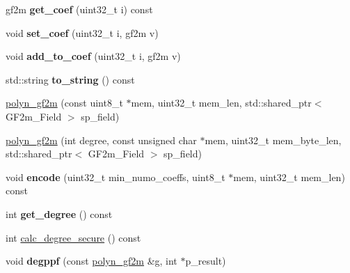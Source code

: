 \begin{DoxyCompactItemize}
\mbox{\label{class_botan_1_1polyn__gf2m_a9dae23a439e281b75b7b814e3bcf150a}} 
gf2m {\bfseries get\+\_\+coef} (uint32\+\_\+t i) const
\item 
\mbox{\label{class_botan_1_1polyn__gf2m_a9541e97454aa675cfe368428f037e050}} 
void {\bfseries set\+\_\+coef} (uint32\+\_\+t i, gf2m v)
\item 
\mbox{\label{class_botan_1_1polyn__gf2m_ac5bcf753353aeff6aafc2b6605fd875d}} 
void {\bfseries add\+\_\+to\+\_\+coef} (uint32\+\_\+t i, gf2m v)
\item 
\mbox{\label{class_botan_1_1polyn__gf2m_a580ea1b2c259a3476170c0f3de6dcaec}} 
std\+::string {\bfseries to\+\_\+string} () const
\item 
\mbox{\hyperlink{class_botan_1_1polyn__gf2m_af9619fa1c8180c0e729d883a89ea3ffc}{polyn\+\_\+gf2m}} (const uint8\+\_\+t $\ast$mem, uint32\+\_\+t mem\+\_\+len, std\+::shared\+\_\+ptr$<$ G\+F2m\+\_\+\+Field $>$ sp\+\_\+field)
\item 
\mbox{\hyperlink{class_botan_1_1polyn__gf2m_a87baa4743b62dc4cbb4c1d73e4578d8c}{polyn\+\_\+gf2m}} (int degree, const unsigned char $\ast$mem, uint32\+\_\+t mem\+\_\+byte\+\_\+len, std\+::shared\+\_\+ptr$<$ G\+F2m\+\_\+\+Field $>$ sp\+\_\+field)
\item 
\mbox{\label{class_botan_1_1polyn__gf2m_a9f9180a4cb3e0f415ec635141b40e554}} 
void {\bfseries encode} (uint32\+\_\+t min\+\_\+numo\+\_\+coeffs, uint8\+\_\+t $\ast$mem, uint32\+\_\+t mem\+\_\+len) const
\item 
\mbox{\label{class_botan_1_1polyn__gf2m_a1a45deb68c9d4235f9493ce62c018486}} 
int {\bfseries get\+\_\+degree} () const
\item 
int \mbox{\hyperlink{class_botan_1_1polyn__gf2m_ac2b94d1eddf27838f4fcf03db4f8ac08}{calc\+\_\+degree\+\_\+secure}} () const
\item 
\mbox{\label{class_botan_1_1polyn__gf2m_a533dee793e004bc1560bcb4d1bd9bb53}} 
void {\bfseries degppf} (const \mbox{\hyperlink{class_botan_1_1polyn__gf2m}{polyn\+\_\+gf2m}} \&g, int $\ast$p\+\_\+result)
\item 

\end{DoxyCompactItemize}

